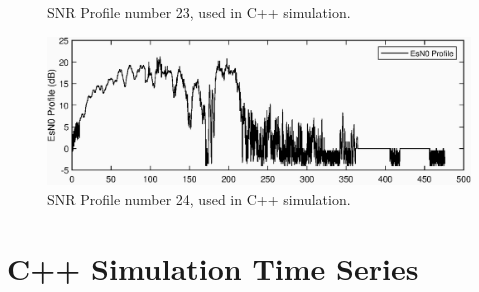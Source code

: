 \begin{appendices}
\begin{figure}[ht!]
\caption{SNR Profile number 23, used in C++ simulation.}
\end{figure}
\begin{figure}[ht!]
\includegraphics{figures/c_sim_snr/EsNo_profile_24.eps}
\caption{SNR Profile number 24, used in C++ simulation.}
\end{figure}
\clearpage
\section{C++ Simulation Time Series}

\end{appendices}
